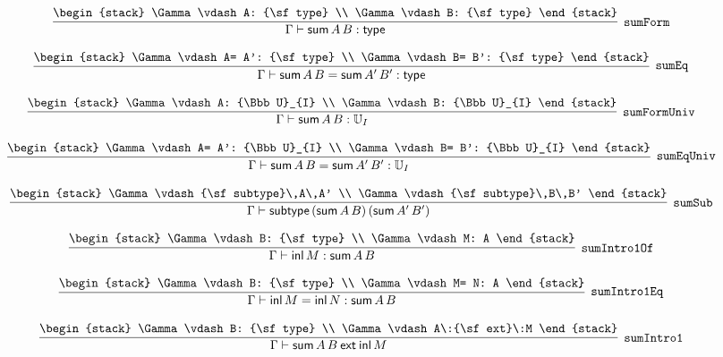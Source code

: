 \[
\infer[{\tt sumForm}]{\Gamma \vdash {\sf sum}\,A\,B: {\sf type}}{
\begin{stack}
\Gamma \vdash A: {\sf type}
\\
\Gamma \vdash B: {\sf type}
\end{stack}}
\]

\[
\infer[{\tt sumEq}]{\Gamma \vdash {\sf sum}\,A\,B= {\sf sum}\,A'\,B': {\sf type}}{
\begin{stack}
\Gamma \vdash A= A': {\sf type}
\\
\Gamma \vdash B= B': {\sf type}
\end{stack}}
\]

\[
\infer[{\tt sumFormUniv}]{\Gamma \vdash {\sf sum}\,A\,B: {\Bbb U}_{I}}{
\begin{stack}
\Gamma \vdash A: {\Bbb U}_{I}
\\
\Gamma \vdash B: {\Bbb U}_{I}
\end{stack}}
\]

\[
\infer[{\tt sumEqUniv}]{\Gamma \vdash {\sf sum}\,A\,B= {\sf sum}\,A'\,B': {\Bbb U}_{I}}{
\begin{stack}
\Gamma \vdash A= A': {\Bbb U}_{I}
\\
\Gamma \vdash B= B': {\Bbb U}_{I}
\end{stack}}
\]

\[
\infer[{\tt sumSub}]{\Gamma \vdash {\sf subtype}\,({\sf sum}\,A\,B)\,({\sf sum}\,A'\,B')}{
\begin{stack}
\Gamma \vdash {\sf subtype}\,A\,A'
\\
\Gamma \vdash {\sf subtype}\,B\,B'
\end{stack}}
\]

\[
\infer[{\tt sumIntro1Of}]{\Gamma \vdash {\sf inl}\,M: {\sf sum}\,A\,B}{
\begin{stack}
\Gamma \vdash B: {\sf type}
\\
\Gamma \vdash M: A
\end{stack}}
\]

\[
\infer[{\tt sumIntro1Eq}]{\Gamma \vdash {\sf inl}\,M= {\sf inl}\,N: {\sf sum}\,A\,B}{
\begin{stack}
\Gamma \vdash B: {\sf type}
\\
\Gamma \vdash M= N: A
\end{stack}}
\]

\[
\infer[{\tt sumIntro1}]{\Gamma \vdash {\sf sum}\,A\,B\:{\sf ext}\:{\sf inl}\,M}{
\begin{stack}
\Gamma \vdash B: {\sf type}
\\
\Gamma \vdash A\:{\sf ext}\:M
\end{stack}}
\]

